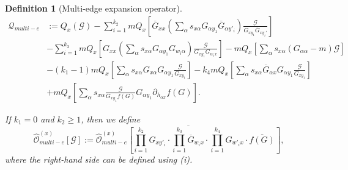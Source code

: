 \documentclass{article}
\newcommand{\1}{\mathds{1}}
\numberwithin{equation}{section}
\newcommand{\al}{\alpha}
\renewcommand{\cal}{\mathcal}
\newcommand{\wh}{\widehat}
\renewcommand{\geq}{\geqslant}
\renewcommand{\ge}{\geq}
\theoremstyle{plain} %
\newtheorem{definition}[theorem]{Definition}
\theoremstyle{remark}
\begin{document}
\begin{definition} [Multi-edge expansion operator]
\begin{align*}
  \cal Q_{multi-e} &:= Q_x \left( \cal G\right)  -  \sum_{i=1}^{k_2}m Q_x \left[ \overline G_{xx}  \left( \sum_\al s_{x\al }G_{\al y_1} \overline G_{\al y'_i}\right)\frac{\cal G}{G_{x y_1} \overline G_{xy_i'}} \right] \\
& - \sum_{i=1}^{k_3} m Q_x \left[ G_{xx} \left(\sum_\al s_{x\al }G_{\al y_1} G_{w_i \al} \right)\frac{\cal G}{G_{xy_1}G_{w_i x}}\right] -  m Q_x \left[  \sum_\al s_{x\al }\left(G_{\al \al}-m\right) \cal G\right] \\
&-(k_1-1) m Q_x \left[  \sum_\al s_{x\al }G_{x \al} G_{\al y_1}  \frac{ \cal G}{G_{xy_1}}\right] - k_4 m Q_x \left[  \sum_\al s_{x\al }\overline G_{\al x} G_{\al y_1}  \frac{\cal G}{G_{xy_1}}\right] \\
& +m Q_x \left[  \sum_\al s_{x\al } \frac{\cal G}{G_{x y_1}f(G)}G_{\al y_1}\partial_{h_{\al x}}f(G)  \right].
 \end{align*} 

 If $k_1=0$ and $k_2\ge 1$, then we define 
$$\wh{\cal O}_{multi-e}^{(x)} \left[\cal G\right]:= \overline{  \wh{\cal O}_{multi-e}^{(x)} \left[\prod_{i=1}^{k_2}G_{x y'_i} \cdot \prod_{i=1}^{k_3} \overline  G_{ w_i x} \cdot \prod_{i=1}^{k_4} G_{ w'_i x} \cdot \overline{f (G)}\right] },$$
where the right-hand side can be defined using (i).

\medskip


\end{definition}
\end{document}
